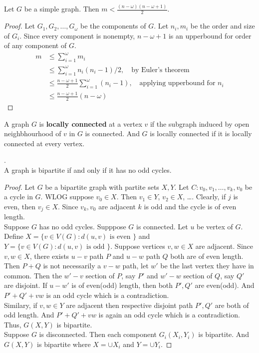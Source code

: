 \begin{exercise}
	Let $G$ be a simple graph.
	Then $m < \frac{(n-\omega)(n-\omega+1)}{2}$.
\end{exercise}
\begin{proof}
	Let $G_1,G_2,\dots,G_\omega$ be the components of $G$.
	Let $n_i,m_i$ be the order and size of $G_i$.
	Since every component is nonempty, $n-\omega+1$ is an upperbound for order of any component of $G$.
	\begin{align*}
		m 
		& \le \sum_{i=1}^\omega m_i\\
		& \le \sum_{i=1}^\omega n_i(n_i-1)/2,\quad \text{by Euler's theorem}\\
		& \le \frac{n-\omega+1}{2} \sum_{i=1}^\omega (n_i - 1),\quad \text{applying upperbound for $n_i$}\\
		& \le \frac{n-\omega+1}{2} (n - \omega)
	\end{align*}
\end{proof}

\begin{definition}
	A graph $G$ is \textbf{locally connected} at a vertex $v$ if the subgraph induced by open neighbhourhood of $v$ in $G$ is connected.
	And $G$ is locally connected if it is locally connected at every vertex.
\end{definition}

\begin{theorem}.\\
	A graph is bipartite if and only if it has no odd cycles.
\end{theorem}
\begin{proof}
	Let $G$ be a bipartite graph with partite sets $X,Y$.
	Let $C : v_0,v_1,\dots,v_k,v_0$ be a cycle in $G$.
	WLOG suppose $v_0 \in X$.
	Then $v_1 \in Y$, $v_2 \in X$, \dots.
	Clearly, if $j$ is even, then $v_j \in X$.
	Since $v_k,v_0$ are adjacent $k$ is odd and the cycle is of even length.\\

	Suppose $G$ has no odd cycles.
	Supppose $G$ is connected.
	Let $u$ be vertex of $G$.
	Define $X = \{ v \in V(G) : d(u,v) \text{ is even } \}$ and $Y = \{ v \in V(G) : d(u,v) \text{ is odd }\}$.
	Suppose vertices $v,w \in X$ are adjacent.
	Since $v,w \in X$, there exists $u-v$ path $P$ and $u-w$ path $Q$ both are of even length. Then $P+Q$ is not necessarily a $v-w$ path, let $w'$ be the last vertex they have in common. Then the $w'-v$ section of $P$, say $P'$ and $w'-w$ section of $Q$, say $Q'$ are disjoint. If $u-w'$ is of even(odd) length, then both $P',Q'$ are even(odd). And $P'+Q'+vw$ is an odd cycle which is a contradiction.\\

	Similary, if $v,w \in Y$ are adjacent then respective disjoint path $P',Q'$ are both of odd length. And $P'+Q'+vw$ is again an odd cycle which is a contradiction. Thus, $G(X,Y)$ is bipartite.\\

	Suppose $G$ is disconnected. Then each component $G_i(X_i,Y_i)$ is bipartite. And $G(X,Y)$ is bipartite where $X = \cup X_i$ and $Y = \cup Y_i$.
\end{proof}

